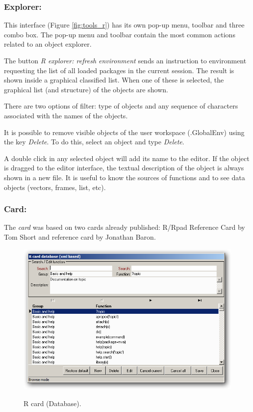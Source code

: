 \newpage
\subsubsection{Explorer:}

This interface
(Figure \ref{fig:tools_r})
has its own pop-up menu, toolbar and three combo box. The
pop-up menu and toolbar contain the most common actions related to an object
explorer.

The button \textit{R explorer: refresh environment} sends an instruction to
\RR{} environment requesting the list of all loaded packages in the current
session. The result is shown inside a graphical classified list. When one
of these is selected, the graphical list (and structure) of the objects
are shown.

There are two options of filter: type of objects and any sequence of
characters associated with the names of the objects.

It is possible to remove visible objects of the user workspace (.GlobalEnv)
using the key \textit{Delete}. To do this, select an object and type
\textit{Delete}.

A double click in any selected object will add its name to the editor.
If the object is dragged to the editor interface, the textual description
of the object is always shown in a new file. It is useful to know the
sources of functions and to see data objects (vectors, frames, list, etc).

\subsubsection{Card:}

The \textit{card} was based on two \RR{} cards already published:
R/Rpad Reference Card by Tom Short and \RR{} reference card by Jonathan Baron.

\begin{figure}[h!]
  \includegraphics[scale=0.35]{./res/rcard_dlg.png}\\
  \caption{R card (Database).}
  \label{fig:rcard_dlg}
\end{figure}


